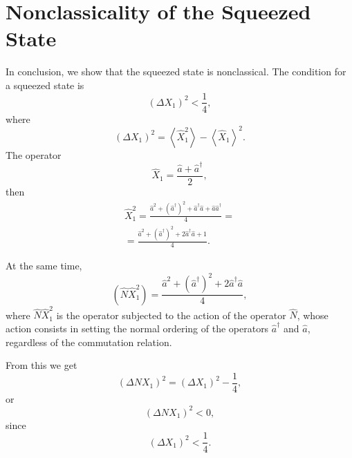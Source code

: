 \section{Nonclassicality of the Squeezed State}
In conclusion, we show that the squeezed state is nonclassical. The condition
for a squeezed state is 
\begin{equation}
\left(\Delta X_1\right)^2 < \frac{1}{4},
\nonumber
\end{equation}
where 
\[
\left(\Delta X_1\right)^2 =
\left<\hat{X}_1^2\right> - 
\left<\hat{X}_1\right>^2.
\]
The operator
\[
\hat{X}_1 = \frac{\hat{a} + \hat{a}^{\dag}}{2},
\]
then 
\begin{eqnarray}
\hat{X}_1^2 = \frac{\hat{a}^2 + \left(\hat{a}^{\dag}\right)^2 +
  \hat{a}^{\dag}\hat{a} + \hat{a} \hat{a}^{\dag}}{4} = 
\nonumber \\
=
\frac{\hat{a}^2 + \left(\hat{a}^{\dag}\right)^2 +
  2 \hat{a}^{\dag}\hat{a} + 1}{4}.
\nonumber
\end{eqnarray}

At the same time, 
\[
\left(\hat{N}\hat{X}_1^2\right) = \frac{
\hat{a}^2 + \left(\hat{a}^{\dag}\right)^2 +
2 \hat{a}^{\dag}\hat{a}}{4},
\]
where $\hat{N}\hat{X}_1^2$ is the operator subjected to the action of the operator
$\hat{N}$, whose action consists in setting the normal ordering of the operators $\hat{a}^{\dag}$ and $\hat{a}$,
regardless of the commutation relation.

From this we get
\begin{equation}
\left(\Delta N X_1\right)^2 = 
\left(\Delta X_1\right)^2 - \frac{1}{4},
\nonumber
\end{equation}
or
\begin{equation}
\left(\Delta N X_1\right)^2 < 0,
\nonumber
\end{equation}
since
\[
\left(\Delta X_1\right)^2 < \frac{1}{4}.
\]

